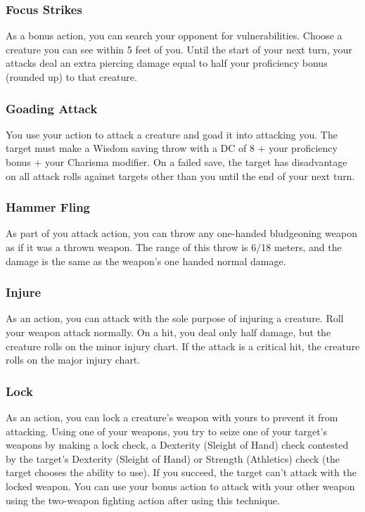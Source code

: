 \subsubsection{Focus Strikes} \label{tec::focusstrikes}
As a bonus action, you can search your opponent for vulnerabilities.
Choose a creature you can see within 5 feet of you.
Until the start of your next turn, your attacks deal an extra piercing damage equal to half your proficiency bonus (rounded up) to that creature.

\subsubsection{Goading Attack} \label{tec::goadingattack}
You use your action to attack a creature and goad it into attacking you.
The target must make a Wisdom saving throw with a DC of 8 + your proficiency bonus + your Charisma modifier.
On a failed save, the target has disadvantage on all attack rolls against targets other than you until the end of your next turn.

\subsubsection{Hammer Fling} \label{tec::hammerfling}
As part of you attack action, you can throw any one-handed bludgeoning weapon as if it was a thrown weapon.
The range of this throw is 6/18 meters, and the damage is the same as the weapon's one handed normal damage.

\subsubsection{Injure} \label{tec::injure}
As an action, you can attack with the sole purpose of injuring a creature.
Roll your weapon attack normally.
On a hit, you deal only half damage, but the creature rolls on the minor injury chart.
If the attack is a critical hit, the creature rolls on the major injury chart.

\subsubsection{Lock} \label{tec::lock}
As an action, you can lock a creature's weapon with yours to prevent it from attacking.
Using one of your weapons, you try to seize one of your target's weapons by making a lock check, a Dexterity (Sleight of Hand) check contested by the target's Dexterity (Sleight of Hand) or Strength (Athletics) check (the target chooses the ability to use).
If you succeed, the target can't attack with the locked weapon.
You can use your bonus action to attack with your other weapon using the two-weapon fighting action after using this technique.

